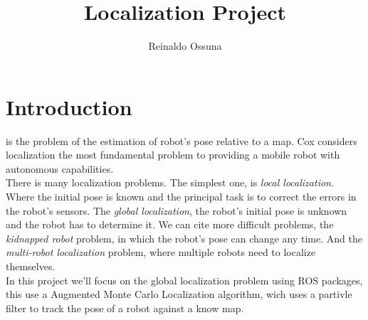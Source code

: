 \documentclass[10pt,journal,compsoc]{IEEEtran}
\begin{document}
\title{Localization Project}



\author{Reinaldo Ossuna}

%
{}



\maketitle
\IEEEdisplaynontitleabstractindextext
\IEEEpeerreviewmaketitle
\section{Introduction}
\label{sec:introduction}

 is the problem of the estimation of robot's pose relative to a map. Cox\cite{cox1991}
considers
localization the most fundamental problem to providing a mobile robot with autonomous capabilities.\\
There is many localization problems. The simplest one, is \textit{local localization}. Where the initial pose is known and the
principal task is to correct the errors in the robot's sensors. The \textit{global localization}, the robot's initial pose is
unknown and the robot has to determine it. We can cite more difficult problems, the \textit{kidnapped
robot} problem, in which the robot's pose can change any time. And the \textit{multi-robot localization} problem, where multiple robots
need to localize themselves.
\\In this project we'll focus on the global localization problem using ROS packages, this use a Augmented Monte Carlo
Localization algorithm, wich uses a partivle filter to track the pose of a robot against a know map.
\end{document}
